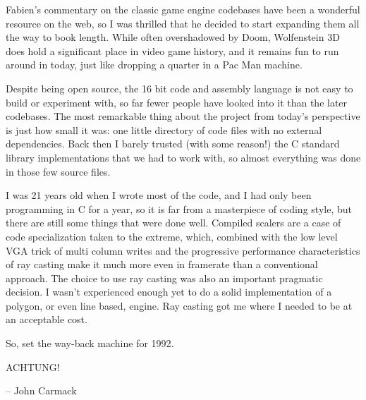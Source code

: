 Fabien's commentary on the classic game engine codebases have been a wonderful resource on the web, so I was thrilled that he decided to start expanding them all the way to book length. While often overshadowed by Doom, Wolfenstein 3D does hold a significant place in video game history, and it remains fun to run around in today, just like dropping a quarter in a Pac Man machine.\\
\par
 Despite being open source, the 16 bit code and assembly language is not easy to build or experiment with, so far fewer people have looked into it than the later codebases. The most remarkable thing about the project from today's perspective is just how small it was: one little directory of code files with no external dependencies.  Back then I barely trusted (with some reason!) the C standard library implementations that we had to work with, so almost everything was done in those few source files.\\
\par
I was 21 years old when I wrote most of the code, and I had only been programming in C for a year, so it is far from a masterpiece of coding style, but there are still some things that were done well. Compiled scalers are a case of code specialization taken to the extreme, which, combined with the low level VGA trick of multi column writes and the progressive performance characteristics of ray casting make it much more even in framerate than a conventional approach. The choice to use ray casting was also an important pragmatic decision.  I wasn't experienced enough yet to do a solid implementation of a polygon, or even line based, engine.  Ray casting got me where I needed to be at an acceptable cost.\\
\par 
So, set the way-back machine for 1992.\\
\par
ACHTUNG!\\
\par
-- John Carmack

